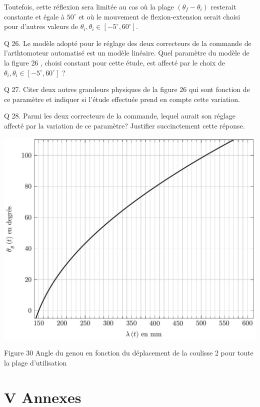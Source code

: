 \documentclass[10pt]{article}
\begin{document}
Toutefois, cette réflexion sera limitée au cas où la plage $\left(\theta_{f}-\theta_{i}\right)$ resterait constante et égale à $50^{\circ}$ et où le mouvement de flexion-extension serait choisi pour d'autres valeurs de $\theta_{i}, \theta_{i} \in\left[-5^{\circ}, 60^{\circ}\right]$.

Q 26. Le modèle adopté pour le réglage des deux correcteurs de la commande de l'arthtomoteur automatisé est un modèle linéaire. Quel paramètre du modèle de la figure 26 , choisi constant pour cette étude, est affecté par le choix de $\theta_{i}, \theta_{i} \in\left[-5^{\circ}, 60^{\circ}\right]$ ?

Q 27. Citer deux autres grandeurs physiques de la figure 26 qui sont fonction de ce paramètre et indiquer si l'étude effectuée prend en compte cette variation.

Q 28. Parmi les deux correcteurs de la commande, lequel aurait son réglage affecté par la variation de ce paramètre? Justifier succinctement cette réponse.

\begin{center}
\includegraphics[max width=\textwidth]{2024_07_14_a83aebba33898893d39fg-18}
\end{center}

Figure 30 Angle du genou en fonction du déplacement de la coulisse 2 pour toute la plage d'utilisation

\section*{V Annexes}
\end{document}
